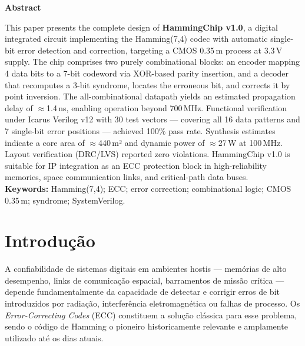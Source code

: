 \documentclass[12pt,a4paper]{article}
\begin{document}
\vspace{6pt}
\begin{center}
  {\large\bfseries\color{bwblack} Abstract}
\end{center}
\begin{unidadebox}[Abstract]
This paper presents the complete design of \textbf{HammingChip v1.0}, a digital integrated circuit implementing the Hamming(7,4) codec with automatic single-bit error detection and correction, targeting a CMOS 0.35\,\textmu m process at 3.3\,V supply. The chip comprises two purely combinational blocks: an encoder mapping 4 data bits to a 7-bit codeword via XOR-based parity insertion, and a decoder that recomputes a 3-bit syndrome, locates the erroneous bit, and corrects it by point inversion. The all-combinational datapath yields an estimated propagation delay of $\approx$1.4\,ns, enabling operation beyond 700\,MHz. Functional verification under Icarus Verilog v12 with 30 test vectors --- covering all 16 data patterns and 7 single-bit error positions --- achieved 100\% pass rate. Synthesis estimates indicate a core area of $\approx$440\,\textmu m² and dynamic power of $\approx$27\,\textmu W at 100\,MHz. Layout verification (DRC/LVS) reported zero violations. HammingChip v1.0 is suitable for IP integration as an ECC protection block in high-reliability memories, space communication links, and critical-path data buses.\\[4pt]
\textbf{Keywords:} Hamming(7,4); ECC; error correction; combinational logic; CMOS 0.35\,\textmu m; syndrome; SystemVerilog.
\end{unidadebox}

\newpage
\tableofcontents
\listoffigures
\listoftables
\newpage

\section{Introdução}

A confiabilidade de sistemas digitais em ambientes hostis --- memórias de alto desempenho, links de comunicação espacial, barramentos de missão crítica --- depende fundamentalmente da capacidade de detectar e corrigir erros de bit introduzidos por radiação, interferência eletromagnética ou falhas de processo. Os \textit{Error-Correcting Codes} (ECC) constituem a solução clássica para esse problema, sendo o código de Hamming o pioneiro historicamente relevante e amplamente utilizado até os dias atuais.
\end{document}
